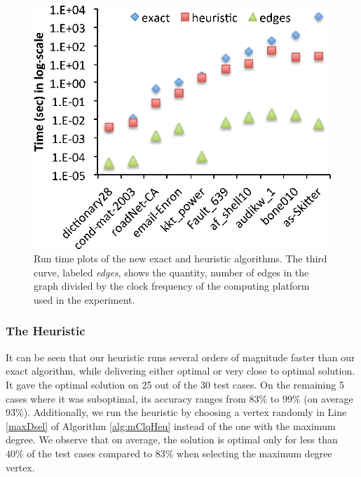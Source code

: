\begin{figure}
    \includegraphics[scale=0.6]{compare_time_rw.eps}
    
 \caption{Run time plots of the new exact and heuristic algorithms. The third curve, labeled
 {\em edges}, shows the quantity, number of edges in the graph divided by the clock 
 frequency of the computing platform used in the experiment. 
 }
\label{fig-runtimeplots}
\end{figure}




\subsubsection{The Heuristic}
\label{sec:exp-heuristic}

It can be seen that our heuristic runs several orders of magnitude faster than our exact algorithm,
while delivering either optimal or very close to optimal solution.
It gave the optimal solution on 25 out of the 30 test cases.
On the remaining 5 cases where it was suboptimal, its accuracy ranges from 83\% to 99\% (on average 93\%).
Additionally, we run the heuristic by choosing a vertex randomly in Line \ref{maxDsel} of Algorithm \ref{alg:mClqHeu} instead of the one with the maximum degree. We observe that on average, the solution is optimal only for less than $40\%$ of the test cases compared to 83\% when selecting the maximum degree vertex.

